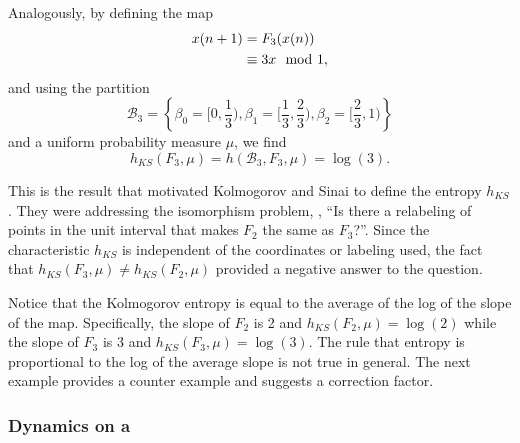 Analogously, by defining the map
\begin{align}
  {x}{(n+1)} &= F_3({x}{(n)})\\
  \label{eq:threex}
  &\equiv 3x \mod 1,
\end{align}
and using the partition
\begin{equation}
  \label{eq:partition3}
  \mathcal{B}_3 = \left\{ \beta_0 = [0,\frac{1}{3}),\beta_1 =
    [\frac{1}{3}, \frac{2}{3} ), \beta_2 = [\frac{2}{3}, 1 )\right\}
\end{equation}
and a uniform probability measure $\mu$, we find
\begin{equation*}
  h_{KS}(F_3,\mu) =h(\mathcal{B}_3,F_3,\mu) = \log(3).
\end{equation*}

This is the result that motivated Kolmogorov and Sinai to define the
entropy $h_{KS}$.  They were addressing the isomorphism problem, \eg, ``Is
there a relabeling of points in the unit interval that makes $F_2$ the
same as $F_3$?''.  Since the characteristic $h_{KS}$ is independent of
the coordinates or labeling used, the fact that $h_{KS}(F_3,\mu) \neq
h_{KS}(F_2,\mu)$ provided a negative answer to the question.

Notice that the Kolmogorov entropy is equal to the average of the log
of the slope of the map.  Specifically, the slope of $F_2$ is 2 and
$h_{KS}(F_2,\mu) = \log(2)$ while the slope of $F_3$ is 3 and
$h_{KS}(F_3,\mu) = \log(3)$.  The rule that entropy is proportional to
the log of the average slope is not true in general.  The next example
provides a counter example and suggests a correction factor.

\subsubsection{Dynamics on a }
\label{sec:Cantor}

